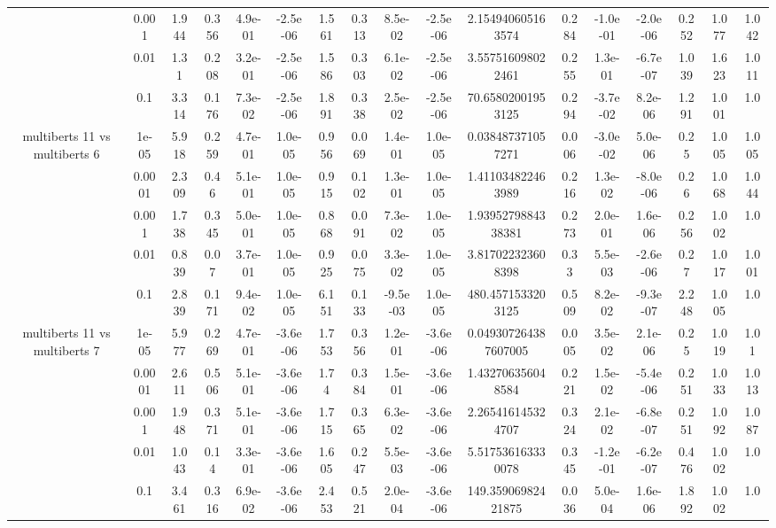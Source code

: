 \begin{tabular}{|c|c|c|c|c|c|c|c|c|c|c|c|c|c|c|c|c|}
 & 0.001 & 1.944 & 0.356 & 4.9e-01 & -2.5e-06 & 1.561 & 0.313 & 8.5e-02 & -2.5e-06 & 2.154940605163574 & 0.284 & -1.0e-01 & -2.0e-06 & 0.252 & 1.077 & 1.042 \\
 & 0.01 & 1.31 & 0.208 & 3.2e-01 & -2.5e-06 & 1.586 & 0.303 & 6.1e-02 & -2.5e-06 & 3.557516098022461 & 0.255 & 1.3e-01 & -6.7e-07 & 1.039 & 1.623 & 1.011 \\
 & 0.1 & 3.314 & 0.176 & 7.3e-02 & -2.5e-06 & 1.891 & 0.338 & 2.5e-02 & -2.5e-06 & 70.65802001953125 & 0.294 & -3.7e-02 & 8.2e-06 & 1.291 & 1.001 & 1.0 \\
\hline
\multirow{5}{*}{multiberts 11 vs multiberts 6} & 1e-05 & 5.918 & 0.259 & 4.7e-01 & 1.0e-05 & 0.956 & 0.069 & 1.4e-01 & 1.0e-05 & 0.038487371057271 & 0.006 & -3.0e-02 & 5.0e-06 & 0.25 & 1.005 & 1.005 \\
 & 0.0001 & 2.309 & 0.46 & 5.1e-01 & 1.0e-05 & 0.915 & 0.102 & 1.3e-01 & 1.0e-05 & 1.411034822463989 & 0.216 & 1.3e-02 & -8.0e-06 & 0.26 & 1.068 & 1.044 \\
 & 0.001 & 1.738 & 0.345 & 5.0e-01 & 1.0e-05 & 0.868 & 0.091 & 7.3e-02 & 1.0e-05 & 1.9395279884338381 & 0.273 & 2.0e-01 & 1.6e-06 & 0.256 & 1.002 & 1.0 \\
 & 0.01 & 0.839 & 0.07 & 3.7e-01 & 1.0e-05 & 0.925 & 0.075 & 3.3e-02 & 1.0e-05 & 3.817022323608398 & 0.33 & 5.5e-03 & -2.6e-06 & 0.27 & 1.017 & 1.001 \\
 & 0.1 & 2.839 & 0.171 & 9.4e-02 & 1.0e-05 & 6.151 & 0.133 & -9.5e-03 & 1.0e-05 & 480.4571533203125 & 0.509 & 8.2e-02 & -9.3e-07 & 2.248 & 1.005 & 1.0 \\
\hline
\multirow{5}{*}{multiberts 11 vs multiberts 7} & 1e-05 & 5.977 & 0.269 & 4.7e-01 & -3.6e-06 & 1.753 & 0.356 & 1.2e-01 & -3.6e-06 & 0.049307264387607005 & 0.005 & 3.5e-02 & 2.1e-06 & 0.25 & 1.019 & 1.01 \\
 & 0.0001 & 2.611 & 0.506 & 5.1e-01 & -3.6e-06 & 1.74 & 0.384 & 1.5e-01 & -3.6e-06 & 1.432706356048584 & 0.221 & 1.5e-02 & -5.4e-06 & 0.251 & 1.033 & 1.013 \\
 & 0.001 & 1.948 & 0.371 & 5.1e-01 & -3.6e-06 & 1.715 & 0.365 & 6.3e-02 & -3.6e-06 & 2.265416145324707 & 0.324 & 2.1e-02 & -6.8e-07 & 0.251 & 1.092 & 1.087 \\
 & 0.01 & 1.043 & 0.14 & 3.3e-01 & -3.6e-06 & 1.605 & 0.247 & 5.5e-03 & -3.6e-06 & 5.517536163330078 & 0.345 & -1.2e-01 & -6.2e-07 & 0.476 & 1.002 & 1.0 \\
 & 0.1 & 3.461 & 0.316 & 6.9e-02 & -3.6e-06 & 2.453 & 0.521 & 2.0e-04 & -3.6e-06 & 149.35906982421875 & 0.036 & 5.0e-04 & 1.6e-06 & 1.892 & 1.002 & 1.0 \\

\end{tabular}

